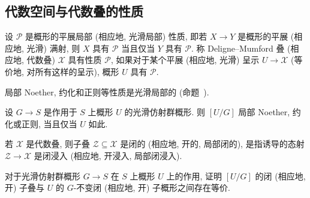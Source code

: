 \subsection{代数空间与代数叠的性质}\label{src:4.3.2-subsection}
\begin{definition}[代数空间与代数叠的性质]\label{src:4.3.7}
设 $\mathcal P$ 是概形的平展局部 (相应地, 光滑局部) 性质, 即若 $X\to Y$ 是概形的平展 (相应地, 光滑) 满射, 则 $X$ 具有 $\mathcal P$ 当且仅当 $Y$ 具有 $\mathcal P$. 称 Deligne--Mumford 叠 (相应地, 代数叠) $\mathcal X$ 具有性质 $\mathcal P$, 如果对于某个平展 (相应地, 光滑) 呈示 $U\to\mathcal X$ (等价地, 对所有这样的呈示), 概形 $U$ 具有 $\mathcal P$.
\end{definition}
局部 Noether, 约化和正则等性质是光滑局部的 (命题~).
\begin{example}\label{src:4.3.8}
设 $G\to S$ 是作用于 $S$ 上概形 $U$ 的光滑仿射群概形. 则 $[U/G]$ 局部 Noether, 约化或正则, 当且仅当 $U$ 如此.
\end{example}
\begin{definition}[子叠]\label{src:4.3.9}
若 $\mathcal X$ 是代数叠, 则子叠 $\mathcal Z\subseteq\mathcal X$ 是闭的 (相应地, 开的, 局部闭的), 是指诱导的态射 $\mathcal Z\to\mathcal X$ 是闭浸入 (相应地, 开浸入, 局部闭浸入).
\end{definition}
\begin{exercise}\label{src:4.3.10}
对于光滑仿射群概形 $G\to S$ 在 $S$ 上概形 $U$ 上的作用, 证明 $[U/G]$ 的闭 (相应地, 开) 子叠与 $U$ 的 $G$-不变闭 (相应地, 开) 子概形之间存在等价.
\end{exercise}

